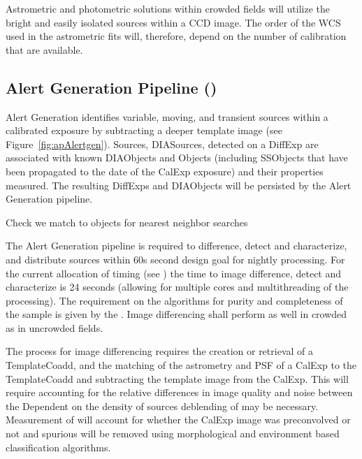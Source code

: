 Astrometric and photometric solutions  within crowded fields will utilize the bright and easily isolated sources within a CCD image. The order of the WCS used in the astrometric fits will, therefore, depend on the number of calibration \Sources that are available.

\subsection{Alert Generation Pipeline (\wbsDiffim)}
\label{sec:apAlertGeneration}

Alert Generation identifies variable, moving, and transient sources within a calibrated exposure by subtracting a deeper template image (see Figure~\ref{fig:apAlertgen}). Sources, DIASources, detected on a DiffExp are associated with known DIAObjects and Objects (including SSObjects that have been propagated to the date of the CalExp exposure) and their properties measured. The resulting DiffExps and DIAObjects will be persisted by the Alert Generation pipeline.
\begin{note} Check we match to objects for nearest neighbor searches \end{note}

The Alert Generation pipeline is required to difference, detect and characterize, and distribute sources within 60s second design goal for nightly processing. For the current allocation of timing (see \hyperref[]{}) the time to image difference, detect and characterize  \DIASources is 24 seconds (allowing for multiple cores and multithreading of the processing). The requirement on the algorithms for purity and completeness of the sample is given by the \DMSR\@. Image differencing shall perform as well in crowded as in uncrowded fields. 

The process for image differencing requires the creation or retrieval of a TemplateCoadd, and the matching of the  astrometry and PSF of a CalExp to the TemplateCoadd and subtracting the template image from the CalExp. This will require accounting for the relative differences in image quality and noise between the Dependent on the density of sources deblending of \DIASources may be necessary. Measurement of \DIASources will account for whether the CalExp image was preconvolved or not and spurious \DIASources will be removed using morphological and environment based classification algorithms. 

